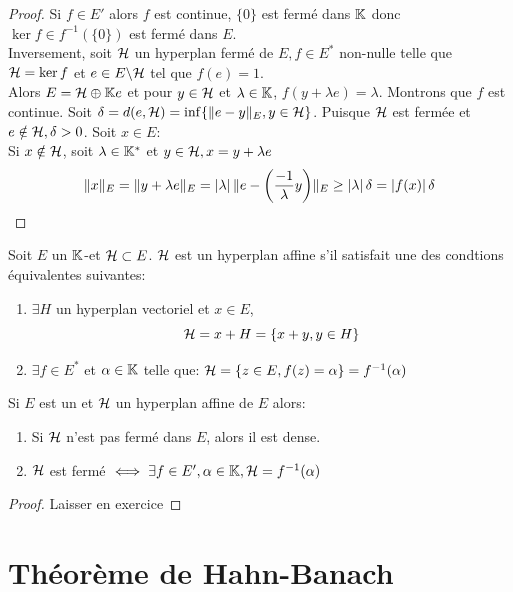 \documentclass[]{report}
\begin{document}
    \begin{proof}
        Si $f\in E'$ alors $f$ est continue, $\{0\}$ est fermé dans $\mathbb{K}$ donc $\ker f\in f^{-1}(\{0\})$ est fermé dans $E$.\\
        Inversement, soit $\mathcal{H}$ un hyperplan fermé de $E, f\in E^*$ non-nulle telle que $\mathcal{H}=\ker f$ et $e\in E\backslash \mathcal{H}$ tel que $f(e)=1$.\\
        Alors $E=\mathcal{H}\oplus \mathbb{K} e$ et pour $y\in \mathcal{H}$ et $\lambda \in \mathbb{K}$, $f(y+\lambda e)=\lambda$. Montrons que $f$ est continue. Soit $\delta=d(e,\mathcal{H})=\inf\{\lVert e-y \rVert_E,y\in \mathcal{H}\}$. Puisque $\mathcal{H}$ est fermée et $e\notin \mathcal{H},\delta>0$. Soit $x\in E$:\\
        Si $x\notin \mathcal{H}$, soit $\lambda\in \mathbb{K}^*$ et $y\in \mathcal{H},x=y+\lambda e$
        \[\lVert x \rVert_E=\lVert y+\lambda e \rVert_E =\left|\lambda\right|\lVert e-\left(\frac{-1}{\lambda}y\right) \rVert_E\ge \left|\lambda\right|\delta=\left|f(x)\right|\delta\]
    \end{proof}

    \begin{dfprop}{}{}
        Soit $E$ un $\mathbb{K}$-\ev et $\mathcal{H}\subset E$. $\mathcal{H}$ est un hyperplan affine s'il satisfait une des condtions équivalentes suivantes:
        \begin{enumerate} 
            \item $\exists H$ un hyperplan vectoriel et $x\in E$,
            \[\mathcal{H}=x+H=\{x+y,y\in H\}\]
            \item $\exists f\in E^*$ et $\alpha\in \mathbb{K}$ telle que: $\mathcal{H}=\{z\in E, f(z)=\alpha\}=f^{-1}(\alpha)$
        \end{enumerate}
        Si $E$ est un \evn et $\mathcal{H}$ un hyperplan affine de $E$ alors:
        \begin{enumerate}
            \item Si $\mathcal{H}$ n'est pas fermé dans $E$, alors il est dense.
            \item $\mathcal{H}$ est fermé $\iff \exists f\in E',\alpha\in \mathbb{K}, \mathcal{H}=f^{-1}(\alpha)$
        \end{enumerate}
    \end{dfprop}

    \begin{proof}
        Laisser en exercice
    \end{proof}

    \section{Théorème de Hahn-Banach}
\end{document}
